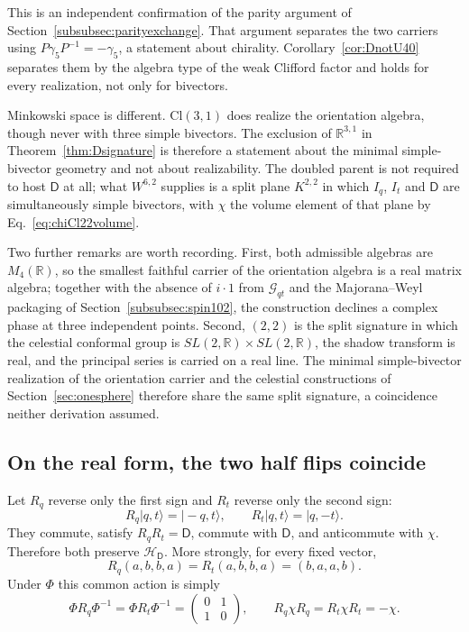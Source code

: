 \documentclass[11pt]{article}
\theoremstyle{definition}\newtheorem{definition}[theorem]{Definition}
\theoremstyle{remark}\newtheorem{remark}[theorem]{Remark}\newtheorem{conjecture}[theorem]{Conjecture}
\begin{document}
This is an independent confirmation of the parity argument of Section~\ref{subsubsec:parityexchange}. That argument separates the two carriers using $P\gamma_5P^{-1}=-\gamma_5$, a statement about chirality. Corollary~\ref{cor:DnotU40} separates them by the algebra type of the weak Clifford factor and holds for every realization, not only for bivectors.

Minkowski space is different. $\mathrm{Cl}(3,1)$ does realize the orientation algebra, though never with three simple bivectors. The exclusion of $\mathbb R^{3,1}$ in Theorem~\ref{thm:Dsignature} is therefore a statement about the minimal simple-bivector geometry and not about realizability. The doubled parent is not required to host $\mathsf D$ at all; what $W^{6,2}$ supplies is a split plane $K^{2,2}$ in which $I_q$, $I_t$ and $\mathsf D$ are simultaneously simple bivectors, with $\chi$ the volume element of that plane by Eq.~\eqref{eq:chiCl22volume}.

Two further remarks are worth recording. First, both admissible algebras are $M_4(\mathbb R)$, so the smallest faithful carrier of the orientation algebra is a real matrix algebra; together with the absence of $i\cdot1$ from $\mathcal G_{qt}$ and the Majorana--Weyl packaging of Section~\ref{subsubsec:spin102}, the construction declines a complex phase at three independent points. Second, $(2,2)$ is the split signature in which the celestial conformal group is $SL(2,\mathbb R)\times SL(2,\mathbb R)$, the shadow transform is real, and the principal series is carried on a real line. The minimal simple-bivector realization of the orientation carrier and the celestial constructions of Section~\ref{sec:onesphere} therefore share the same split signature, a coincidence neither derivation assumed.

\subsection{On the real form, the two half flips coincide}\label{subsec:halffliprealform}
Let $R_q$ reverse only the first sign and $R_t$ reverse only the second sign:
\begin{equation}
 R_q|q,t\rangle=|-q,t\rangle,
 \qquad
 R_t|q,t\rangle=|q,-t\rangle.
\end{equation}
They commute, satisfy $R_qR_t=\mathsf D$, commute with $\mathsf D$, and anticommute with $\chi$. Therefore both preserve $\mathcal H_{\mathsf D}$. More strongly, for every fixed vector,
\begin{equation}\label{eq:halfFlipSameRealForm}
 \boxed{
 R_q(a,b,b,a)=R_t(a,b,b,a)=(b,a,a,b).}
\end{equation}
Under $\Phi$ this common action is simply
\begin{equation}\label{eq:halfflipsigma1}
 \Phi R_q\Phi^{-1}
 =\Phi R_t\Phi^{-1}
 =\begin{pmatrix}0&1\\1&0\end{pmatrix},
 \qquad
 R_q\chi R_q=R_t\chi R_t=-\chi.
\end{equation}
\end{document}
